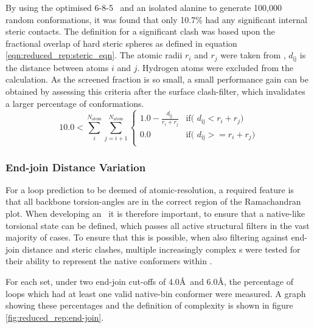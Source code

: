 By using the optimised 6-8-5 \angleset\ and an isolated alanine  to generate 100,000 random conformations, it was found that only 10.7\% had any significant internal steric contacts. The definition for a significant clash was based upon the fractional overlap of hard steric spheres as defined in equation \ref{eqn:reduced_rep:steric_eqn}.
The atomic radii $r_i$ and $r_j$ were taken from \amberff, $d_\text{ij}$ is the distance between atoms $i$ and $j$.
Hydrogen atoms were excluded from the calculation. As the screened fraction is so small, a small performance gain can be obtained by assessing this criteria after the surface clash-filter, which invalidates a larger percentage of conformations.\begin{equation}
10.0 < \sum_i^{N_\text{atom}} \sum_{j=i+1}^{N_\text{atom}} 
\left\{ 
\begin{array}{ll} 
  1.0 - \displaystyle \frac{ d_\text{ij}\ }{ r_i + r _j } & 
  \mbox{if( $d_\text{ij} <  r_i + r _j$} ) \\
  0.0 & \mbox{if( $d_\text{ij} >= r_i + r _j$} ) \\
\end{array}
\right.
\label{eqn:reduced_rep:steric_eqn}
\end{equation}

\subsubsection{End-join Distance Variation}

For a loop prediction to be deemed of atomic-resolution, a required feature is that all backbone torsion-angles are in the correct region of the Ramachandran plot. When developing an \angleset\ it is therefore important, to ensure that a native-like torsional state can be defined, which passes all active structural filters in the vast majority of cases.  To ensure that this is possible, when also filtering against end-join distance and steric clashes, multiple increasingly complex \angleset s were tested for their ability to represent the native conformers within \thothloopdb. 

For each set, under two end-join cut-offs of 4.0\AA\ and 6.0\AA,
the percentage of loops which had at least one valid native-bin conformer were measured. A graph showing these percentages and the definition of complexity is shown in figure \ref{fig:reduced_rep:end-join}. 

